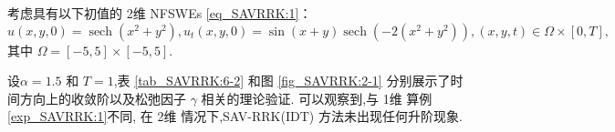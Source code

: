 	\begin{example}\label{exp_SAVRRK:2}
		考虑具有以下初值的 2维 NFSWEs \eqref{eq_SAVRRK:1}：
		\begin{equation*}
		u(x, y, 0)=\operatorname{sech}\left(x^2+y^2\right), u_t(x, y, 0)=\sin (x+y) \operatorname{sech}\left(-2\left(x^2+y^2\right)\right),(x, y, t) \in \Omega \times[0, T],
		\end{equation*}
		其中 $\Omega=[-5,5] \times[-5,5]$.
		\end{example}
			
		设$\alpha=1.5$ 和 $T=1$,表 \ref{tab_SAVRRK:6-2} 和图 \ref{fig_SAVRRK:2-1} 分别展示了时间方向上的收敛阶以及松弛因子 $\gamma$ 相关的理论验证.
		可以观察到,与 1维 算例\ref{exp_SAVRRK:1}不同, 在 2维 情况下,SAV-RRK(IDT) 方法未出现任何升阶现象.

